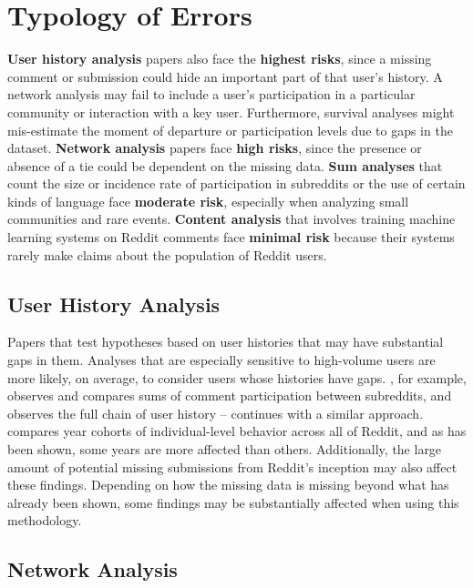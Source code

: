 \documentclass[letterpaper,12pt]{article}
\begin{document}
\section{Typology of Errors}

\textbf{User history analysis} papers also face the \textbf{highest risks}, since a missing comment or submission could hide an important part of that user’s history. A network analysis may fail to include a user’s participation in a particular community or interaction with a key user. Furthermore, survival analyses might mis-estimate the moment of departure or participation levels due to gaps in the dataset. \textbf{Network analysis} papers face \textbf{high risks}, since the presence or absence of a tie could be dependent on the missing data. \textbf{Sum analyses} that count the size or incidence rate of participation in subreddits or the use of certain kinds of language face \textbf{moderate risk}, especially when analyzing small communities and rare events. \textbf{Content analysis} that involves training machine learning systems on Reddit comments face \textbf{minimal risk} because their systems rarely make claims about the population of Reddit users.

\subsection{User History Analysis}

Papers that test hypotheses based on user histories that may have substantial gaps in them. Analyses that are especially sensitive to high-volume users are more likely, on average, to consider users whose histories have gaps. , for example, observes and compares sums of comment participation between subreddits, and observes the full chain of user history --  continues with a similar approach.  compares year cohorts of individual-level behavior across all of Reddit, and as has been shown, some years are more affected than others. Additionally, the large amount of potential missing submissions from Reddit's inception may also affect these findings. Depending on how the missing data is missing beyond what has already been shown, some findings may be substantially affected when using this methodology.

\subsection{Network Analysis}
\end{document}
